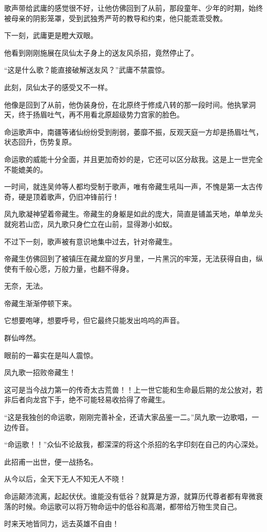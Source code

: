 \begin{this_body}
歌声带给武庸的感觉很不好，让他仿佛回到了从前，那段童年、少年的时期，始终被母亲的阴影笼罩，受到武独秀严苛的教导和约束，他只能乖乖受教。

下一刻，武庸更是瞪大双眼。

他看到刚刚施展在凤仙太子身上的送友风杀招，竟然停止了。

“这是什么歌？能直接破解送友风？”武庸不禁震惊。

此刻，凤仙太子的感受又不一样。

他像是回到了从前，他伪装身份，在北原终于修成八转的那一段时间。他执掌洞天，终于扬眉吐气，再不用看北原超级势力宫家的脸色。

命运歌声中，南疆等诸仙纷纷受到削弱，萎靡不振，反观天庭一方却是扬眉吐气，状态回升，伤势复原。

命运歌的威能十分全面，并且更加奇妙的是，它还可以区分敌我。这是上一世完全不能媲美的。

一时间，就连吴帅等人都均受制于歌声，唯有帝藏生吼叫一声，不愧是第一太古传奇，硬是顶着歌声，仍旧冲锋前行！

凤九歌凝神望着帝藏生。帝藏生的身躯是如此的庞大，简直是铺盖天地，单单龙头就宛若山峦，凤九歌只身伫立在山前，显得渺小如蚁。

不过下一刻，歌声被有意识地集中过去，针对帝藏生。

帝藏生仿佛回到了被镇压在藏龙窟的岁月里，一片黑沉的牢笼，无法获得自由，纵使有千般心愿，万般力量，也翻不得身。

无奈，无法。

帝藏生渐渐停顿下来。

它想要咆哮，想要呼号，但它最终只能发出呜呜的声音。

群仙哗然。

眼前的一幕实在是叫人震惊。

凤九歌一招败帝藏生！

这可是当今战力第一的传奇太古荒兽！！上一世它能和生命最后期的龙公放对，若非后者向龙宫下手，绝不可能轻易收拾得了帝藏生。

“这是我独创的命运歌，刚刚完善补全，还请大家品鉴一二。”凤九歌一边歌唱，一边传音。

“命运歌！！”众仙不论敌我，都深深的将这个杀招的名字印刻在自己的内心深处。

此招甫一出世，便一战扬名。

从今以后，全天下无人不知无人不晓！

命运颠沛流离，起起伏伏。谁能没有低谷？就算是方源，就算历代尊者都有卑微衰落的时候。命运歌可以将万物命运中的低谷和高潮，都带给万物生灵自己。

时来天地皆同力，远去英雄不自由！


\end{this_body}
